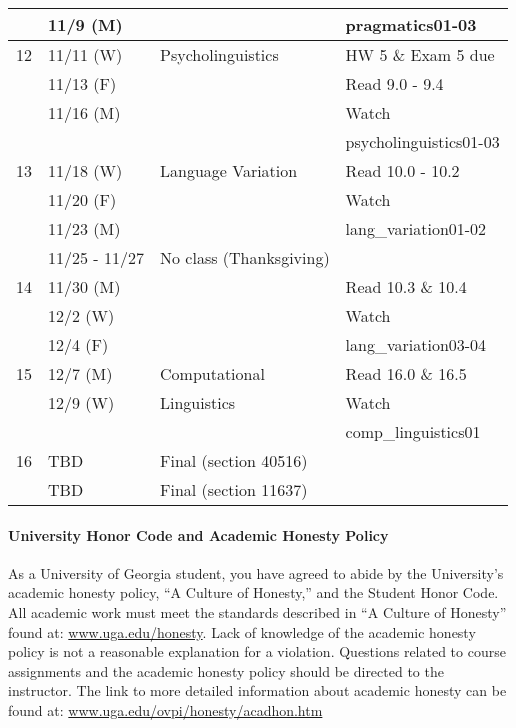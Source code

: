 \documentclass{article}
\begin{document}
\begin{longtable}{c l l | l}
            & 11/9 (M)    &                                 & pragmatics01-03\\
      \hline
      12    & 11/11 (W)   & Psycholinguistics               & HW 5 \& Exam 5 due\\
            & 11/13 (F)   &                                 & Read 9.0 - 9.4\\
            & 11/16 (M)   &                                 & Watch\\
            &             &                                 & psycholinguistics01-03\\
      \hline
      13    & 11/18 (W)   & Language Variation              & Read 10.0 - 10.2\\
            & 11/20 (F)   &                                 & Watch\\
            & 11/23 (M)   &                                 & lang\_variation01-02\\
            & 11/25 - 11/27 & No class (Thanksgiving)       & \\
      \hline
      14    & 11/30 (M)   &                                 & Read 10.3 \& 10.4\\
            & 12/2 (W)    &                                 & Watch\\
            & 12/4 (F)    &                                 & lang\_variation03-04\\
      \hline
      15    & 12/7 (M)    & Computational                   & Read 16.0 \& 16.5\\
            & 12/9 (W)    & Linguistics                     & Watch\\
            &             &                                 & comp\_linguistics01\\
      \hline
      16    & TBD         & Final (section 40516)           & \\
            & TBD         & Final (section 11637)           &
    \end{longtable}

  \paragraph{University Honor Code and Academic Honesty Policy}
    As a University of Georgia student, you have agreed to abide by the University’s academic honesty policy, ``A Culture of Honesty,'' and the Student Honor Code. All academic work must meet the standards described in ``A Culture of Honesty'' found at: \url{www.uga.edu/honesty}. Lack of knowledge of the academic honesty policy is not a reasonable explanation for a violation. Questions related to course assignments and the academic honesty policy should be directed to the instructor. The link to more detailed information about academic honesty can be found at: \url{www.uga.edu/ovpi/honesty/acadhon.htm}
\end{document}
